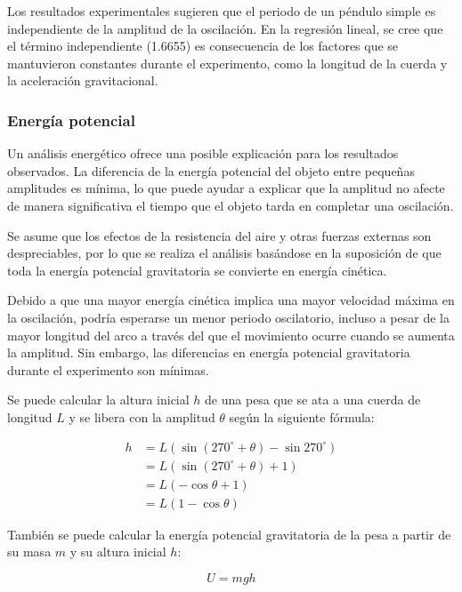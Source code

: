 \documentclass[letterpaper]{report}
\numberwithin{table}{section}
\begin{document}
Los resultados experimentales sugieren que el periodo de un péndulo simple es
independiente de la amplitud de la oscilación. En la regresión lineal, se cree
que el término independiente (1.6655) es consecuencia de los factores
que se mantuvieron constantes durante el experimento, como la
longitud de la cuerda y la aceleración gravitacional.

\subsubsection{Energía potencial}

Un análisis energético ofrece una posible explicación para los resultados
observados. La diferencia de la energía potencial del objeto entre
pequeñas amplitudes es mínima, lo que puede ayudar a explicar que la
amplitud no afecte de manera significativa el tiempo que el objeto
tarda en completar una oscilación.

Se asume que los efectos de la resistencia del aire y otras fuerzas
externas son despreciables, por lo que se realiza el análisis
basándose en la suposición de que toda la energía potencial gravitatoria
se convierte en energía cinética.

Debido a que una mayor energía cinética implica una mayor velocidad
máxima en la oscilación, podría esperarse un menor periodo
oscilatorio, incluso a pesar de la mayor longitud del arco a través
del que el movimiento ocurre cuando se aumenta la amplitud. Sin
embargo, las diferencias en energía potencial gravitatoria durante
el experimento son mínimas.

Se puede calcular la altura inicial $h$ de una pesa que se ata a una cuerda de
longitud $L$ y se libera con la amplitud $\theta$ según la siguiente fórmula:

\begin{align}
  h &= L(\sin{(270^{\circ} + \theta)} - \sin{270^{\circ}}) \nonumber \\
  &= L(\sin{(270^{\circ} + \theta)} + 1) \nonumber \\
  &= L(-\cos{\theta} + 1) \nonumber \\
  &= L(1 - \cos{\theta})
\end{align}

También se puede calcular la energía potencial gravitatoria de la pesa
a partir de su masa $m$ y su altura inicial $h$:

\begin{equation}
  U = mgh
\end{equation}
\end{document}
